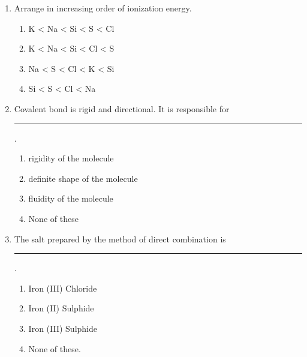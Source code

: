 \begin{enumerate}[label=(\roman*)]

    \item Arrange  in increasing order of ionization energy.

        \begin{multicols}{2}
        \begin{enumerate}[label=(\alph*)]
            \setlength\itemsep{0em}
            \item K < Na < Si < S < Cl
            \item K < Na < Si < Cl < S
            \item Na < S < Cl < K < Si
            \item Si < S < Cl < Na
        \end{enumerate}
        \end{multicols}

    \item Covalent bond is rigid and directional. It is responsible for \rule{1.5cm}{0.15mm}. 

        \begin{enumerate}[label=(\alph*)]
            \setlength\itemsep{0em}
            \item rigidity of the molecule
            \item definite shape of the molecule
            \item fluidity of the molecule
            \item None of these
        \end{enumerate}

    \newpage
    \item  The salt prepared by the method of direct combination is \rule{1.5cm}{0.15mm}.

        \begin{multicols}{2}
        \begin{enumerate}[label=(\alph*)]
            \setlength\itemsep{0em}
            \item Iron (III) Chloride
            \item Iron (II) Sulphide
            \item Iron (III) Sulphide
            \item None of these.
        \end{enumerate}
        \end{multicols}


\end{enumerate}
